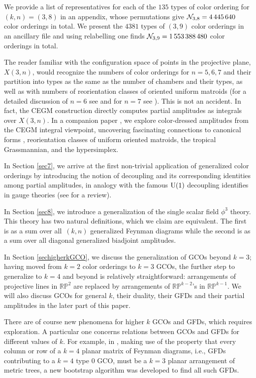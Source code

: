 \documentclass[pdftex]{sigma}
\theoremstyle{definition}
\numberwithin{equation}{section}
\begin{document}
We provide a list of representatives for each of the $135$ types of color ordering for ${(k,n)=(3,8)}$ in an appendix, whose permutations give ${\cal N}_{3,8}= 4\, 445\, 640$ color orderings in total.
We present the $4381$ types of $(3,9)$ color orderings in an ancillary file and using relabelling one finds ${{\cal N}_{3,9} = 1 \,553\, 388\, 480}$ color orderings in total.

The reader familiar with the configuration space of points in the projective plane, $X(3,n)$, would recognize the numbers of color orderings for $n=5,6,7$ and their partition into types as the same as the number of chambers and their types, as well as with numbers of reorientation classes of oriented uniform matroids (for a detailed discussion of $n=6$ see \cite{yoshida2013hypergeometric} and for $n=7$ see \cite{sekiguchi1999configurations}). This is not an accident. In fact, the CEGM construction directly computes partial amplitudes as integrals over $X(3,n)$. In a companion paper \cite{Cachazo:2023ltw}, we explore color-dressed amplitudes from the CEGM integral viewpoint, uncovering fascinating connections to canonical forms \cite{Arkani-Hamed:2020cig}, reorientation classes of uniform oriented matroids, the tropical Grassmannian, and the hypersimplex.

In Section \ref{sec7}, we arrive at the first non-trivial application of generalized color orderings by introducing the notion of decoupling and its corresponding identities among partial amplitudes, in analogy with the famous ${\rm U}(1)$ decoupling identifies in gauge theories (see \cite{Mangano:1990by} for a review).

In Section \ref{sec8}, we introduce a generalization of the single scalar field $\phi^3$ theory. This theory has two natural definitions, which we claim are equivalent. The first is as a sum over all~$(k,n)$ generalized Feynman diagrams while the second is as a sum over all diagonal generalized biadjoint amplitudes.

In Section \ref{sechigherkGCO}, we discuss the generalization of GCOs beyond $k=3$; having moved from $k=2$ color orderings to $k=3$ GCOs, the further step to generalize to $k=4$ and beyond is relatively straightforward: arrangements of projective lines in $\mathbb{RP}^{2}$ are replaced by arrangements of $\mathbb{RP}^{k-2}$'s in $\mathbb{RP}^{k-1}$. We will also discuss GCOs for general $k$, their duality, their GFDs and their partial amplitudes in the later part of this paper.

There are of course new phenomena for higher $k$ GCOs and GFDs, which requires exploration. A particular one concerns relations between GCOs and GFDs for different values of $k$. For example, in \cite{Cachazo:2019xjx}, making use of the property that every column or row of a $k=4$ planar matrix of Feynman diagrams, i.e., GFDs contributing to a $k=4$ type 0 GCO, must be a $k=3$ planar arrangement of metric trees, a new bootstrap algorithm was developed to find all such GFDs.
\end{document}
